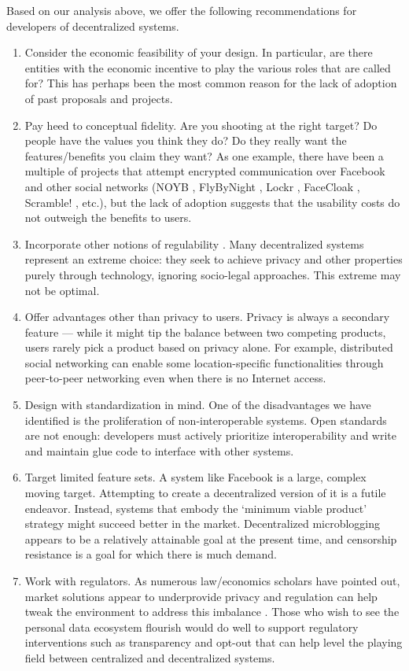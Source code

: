 \documentclass{acm_proc_article-sp}
\begin{document}
Based on our analysis above, we offer the following recommendations for developers of decentralized systems.
\vspace{-5mm}
\begin{enumerate}
	\item Consider the economic feasibility of your design. In particular, are there entities with the economic incentive to play the various roles that are called for? This has perhaps been the most common reason for the lack of adoption of past proposals and projects.
  \item Pay heed to conceptual fidelity. Are you shooting at the right target? Do people have the values you think they do? Do they really want the features/benefits you claim they want? As one example, there have been a multiple of projects that attempt encrypted communication over Facebook and other social networks (NOYB \cite{noyb}, FlyByNight \cite{flybynight}, Lockr \cite{lockr}, FaceCloak \cite{facecloak}, Scramble! \cite{scramble}, etc.), but the lack of adoption suggests that the usability costs do not outweigh the benefits to users.
  \item Incorporate other notions of regulability \cite{Zittrain, lessigcode}. Many decentralized systems represent an extreme choice: they seek to achieve privacy and other properties purely through technology, ignoring socio-legal approaches. This extreme may not be optimal. 
  \item Offer advantages other than privacy to users. Privacy is always a secondary feature --- while it might tip the balance between two competing products, users rarely pick a product based on privacy alone. For example, distributed social networking can enable some location-specific functionalities through peer-to-peer networking even when there is no Internet access.
  \item Design with standardization in mind. One of the disadvantages we have identified is the proliferation of non-interoperable systems. Open standards are not enough: developers must actively prioritize interoperability and write and maintain glue code to interface with other systems.
  \item Target limited feature sets. A system like Facebook is a large, complex moving target. Attempting to create a decentralized version of it is a futile endeavor. Instead, systems that embody the `minimum viable product' strategy might succeed better in the market. Decentralized microblogging appears to be a relatively attainable goal at the present time, and censorship resistance is a goal for which there is much demand.
  \item Work with regulators. As numerous law/economics scholars have pointed out, market solutions appear to underprovide privacy and regulation can help tweak the environment to address this imbalance \cite{Schwartz}. Those who wish to see the personal data ecosystem flourish would do well to support regulatory interventions such as transparency and opt-out that can help level the playing field between centralized and decentralized systems.
\end{enumerate}
\end{document}
